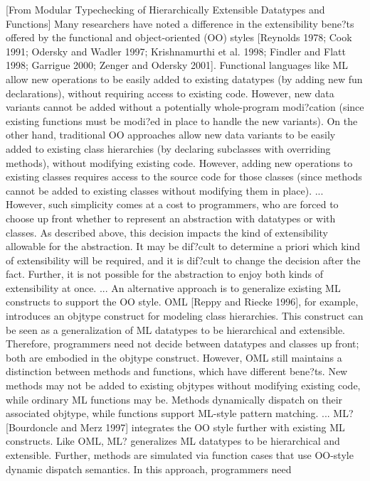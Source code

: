 \documentclass[submission,copyright]{eptcs}
\begin{document}
[From Modular Typechecking of Hierarchically Extensible Datatypes and Functions]
Many researchers have noted a difference in the extensibility bene?ts offered
by the functional and object-oriented (OO) styles [Reynolds 1978; Cook 1991;
Odersky and Wadler 1997; Krishnamurthi et al. 1998; Findler and Flatt 1998;
Garrigue 2000; Zenger and Odersky 2001]. Functional languages like ML allow new operations to be easily added to existing datatypes (by adding new
fun declarations), without requiring access to existing code. However, new data
variants cannot be added without a potentially whole-program modi?cation
(since existing functions must be modi?ed in place to handle the new variants). On the other hand, traditional OO approaches allow new data variants
to be easily added to existing class hierarchies (by declaring subclasses with
overriding methods), without modifying existing code. However, adding new operations to existing classes requires access to the source code for those classes
(since methods cannot be added to existing classes without modifying them in
place).
...
However, such simplicity comes at a cost to programmers, who are forced to choose
up front whether to represent an abstraction with datatypes or with classes. As
described above, this decision impacts the kind of extensibility allowable for the
abstraction. It may be dif?cult to determine a priori which kind of extensibility
will be required, and it is dif?cult to change the decision after the fact. Further, it is not possible for the abstraction to enjoy both kinds of extensibility at
once.
...
An alternative approach is to generalize existing ML constructs to support
the OO style. OML [Reppy and Riecke 1996], for example, introduces an objtype
construct for modeling class hierarchies. This construct can be seen as a generalization of ML datatypes to be hierarchical and extensible. Therefore, programmers need not decide between datatypes and classes up front; both are
embodied in the objtype construct. However, OML still maintains a distinction
between methods and functions, which have different bene?ts. New methods
may not be added to existing objtypes without modifying existing code, while
ordinary ML functions may be. Methods dynamically dispatch on their associated objtype, while functions support ML-style pattern matching.
...
ML? [Bourdoncle and Merz 1997] integrates the OO style further with existing ML constructs. Like OML, ML? generalizes ML datatypes to be hierarchical and extensible. Further, methods are simulated via function cases that use
OO-style dynamic dispatch semantics. In this approach, programmers need
\end{document}
